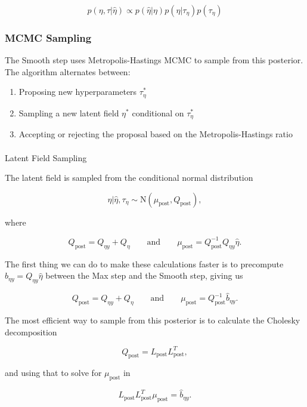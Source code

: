 \documentclass[
  letterpaper,
  DIV=11,
  numbers=noendperiod]{scrartcl}
\makeatletter
\let\oldparagraph\paragraph
\renewcommand{\paragraph}{
    \@ifstar
      \xxxParagraphStar
      \xxxParagraphNoStar
  }
\newcommand{\xxxParagraphStar}[1]{\oldparagraph*{#1}\mbox{}}
\newcommand{\xxxParagraphNoStar}[1]{\oldparagraph{#1}\mbox{}}
\providecommand{\tightlist}{%
  \setlength{\itemsep}{0pt}\setlength{\parskip}{0pt}}\usepackage{longtable,booktabs,array}
\makeatother
\begin{document}
\[
p(\eta, \tau | \hat{\eta}) \propto p(\hat{\eta} | \eta) p(\eta | \tau_\eta) p(\tau_\eta)
\]

\subsubsection{MCMC Sampling}\label{mcmc-sampling}

The Smooth step uses Metropolis-Hastings MCMC to sample from this
posterior. The algorithm alternates between:

\begin{enumerate}
\def\labelenumi{\arabic{enumi}.}
\tightlist
\item
  Proposing new hyperparameters \(\tau_\eta^*\)
\item
  Sampling a new latent field \(\eta^*\) conditional on \(\tau_\eta^*\)
\item
  Accepting or rejecting the proposal based on the Metropolis-Hastings
  ratio
\end{enumerate}

\paragraph{Latent Field Sampling}\label{latent-field-sampling}

The latent field is sampled from the conditional normal distribution

\[
\eta \vert \hat\eta, \tau_\eta \sim \mathrm{N}(\mu_{\text{post}}, Q_{\text{post}}),
\]

where

\[
Q_{\text{post}} = Q_{\eta y} + Q_\eta
\qquad
\text{and}
\qquad
\mu_{\text{post}} = Q_{\text{post}}^{-1}Q_{\eta y}\hat\eta.
\]

The first thing we can do to make these calculations faster is to
precompute \(\hat b_{\eta y} = Q_{\eta y} \hat \eta\) between the Max
step and the Smooth step, giving us

\[
Q_{\text{post}} = Q_{\eta y} + Q_\eta
\qquad
\text{and}
\qquad
\mu_{\text{post}} = Q_{\text{post}}^{-1}\hat b_{\eta y}.
\]

The most efficient way to sample from this posterior is to calculate the
Cholesky decomposition

\[
Q_{\text{post}} = L_{\text{post}}L_{\text{post}}^T,
\]

and using that to solve for \(\mu_\text{post}\) in

\[
L_{\text{post}}L_{\text{post}}^T \mu_\text{post} = \hat b_{\eta y}.
\]
\end{document}
